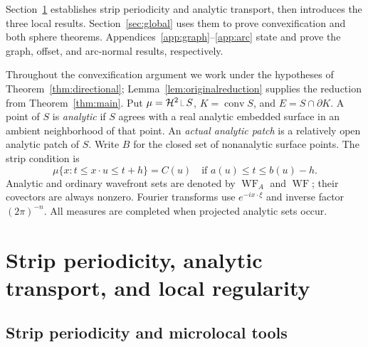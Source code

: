 \documentclass[11pt]{article}
\newcommand{\HH}{\mathcal H}
\newcommand{\WF}{\operatorname{WF}_{A}}
\newcommand{\WFinfty}{\operatorname{WF}}
\newcommand{\conv}{\operatorname{conv}}
\newcommand{\restr}{\mathbin{\vrule height 1.4ex depth 0pt width .06ex\vrule height .06ex depth 0pt width .65ex}}
\begin{document}
Section~\ref{sec:foundation} establishes strip periodicity and analytic transport, then introduces the three local results. Section~\ref{sec:global} uses them to prove convexification and both sphere theorems. Appendices~\ref{app:graph}--\ref{app:arc} state and prove the graph, offset, and arc-normal results, respectively.

Throughout the convexification argument we work under the hypotheses of Theorem~\ref{thm:directional}; Lemma~\ref{lem:originalreduction} supplies the reduction from Theorem~\ref{thm:main}. Put $\mu=\HH^2\restr S$, $K=\conv S$, and $E=S\cap\partial K$. A point of $S$ is \emph{analytic} if $S$ agrees with a real analytic embedded surface in an ambient neighborhood of that point. An \emph{actual analytic patch} is a relatively open analytic patch of $S$. Write $B$ for the closed set of nonanalytic surface points. The strip condition is
\begin{equation}\label{strip}
 \mu\{x:t\le x\cdot u\le t+h\}=C(u)
 \quad\text{if }a(u)\le t\le b(u)-h.
\end{equation}
Analytic and ordinary wavefront sets are denoted by $\WF$ and $\WFinfty$; their covectors are always nonzero. Fourier transforms use $e^{-ix\cdot\xi}$ and inverse factor $(2\pi)^{-n}$. All measures are completed when projected analytic sets occur.

\section{Strip periodicity, analytic transport, and local regularity}\label{sec:foundation}
\subsection{Strip periodicity and microlocal tools}
\end{document}
